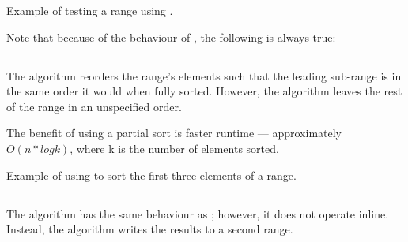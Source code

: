 \begin{box-note}
\footnotesize Example of testing a range using .
\tcblower
{}
\end{box-note}

Note that because of the behaviour of , the following is always true:\\
\small{}

\subsection{\texorpdfstring{}{\texttt{std::partial\_sort}}}

The  algorithm reorders the range's elements such that the leading sub-range is in the same order it would when fully sorted. However, the algorithm leaves the rest of the range in an unspecified order.



The benefit of using a partial sort is faster runtime — approximately $O(n*logk)$, where k is the number of elements sorted.

\begin{box-note}
\footnotesize Example of using  to sort the first three elements of a range.
\tcblower
{}
\end{box-note}

\subsection{\texorpdfstring{}{\texttt{std::partial\_sort\_copy}}}

The  algorithm has the same behaviour as ; however, it does not operate inline. Instead, the algorithm writes the results to a second range.


